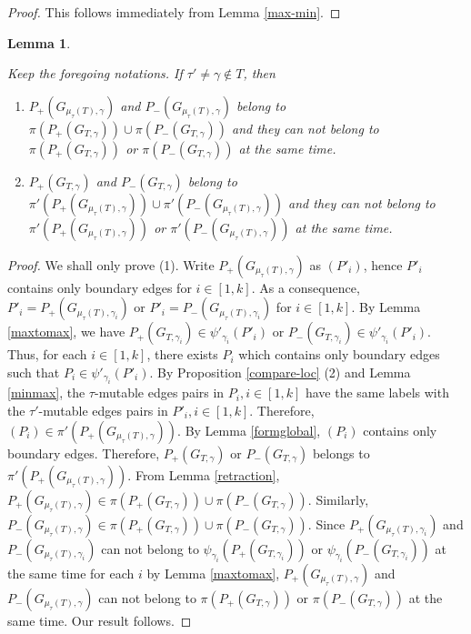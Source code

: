\documentclass[10pt]{amsart}
\theoremstyle{theorems}
\newtheorem{Lemma}[Theorem]{Lemma}
\begin{document}
\begin{proof}

This follows immediately from Lemma \ref{max-min}.
\end{proof}

\medskip

\begin{Lemma}\label{maxtomax1}

Keep the foregoing notations. If $\tau'\neq \gamma\notin T$, then

\begin{enumerate}[$(1)$]

  \item $P_{+}(G_{\mu_{\tau}(T),\gamma})$ and $P_{-}(G_{\mu_{\tau}(T),\gamma})$ belong to $\pi(P_{+}(G_{T,\gamma}))\cup \pi(P_{-}(G_{T,\gamma}))$ and they can not belong to $\pi(P_{+}(G_{T,\gamma}))$ or $\pi(P_{-}(G_{T,\gamma}))$ at the same time.

  \item $P_{+}(G_{T,\gamma})$ and $P_{-}(G_{T,\gamma})$ belong to $\pi'(P_{+}(G_{\mu_{\tau}(T),\gamma}))\cup \pi'(P_{-}(G_{\mu_{\tau}(T),\gamma}))$ and they can not belong to $\pi'(P_{+}(G_{\mu_{\tau}(T),\gamma}))$ or $\pi'(P_{-}(G_{\mu_{\tau}(T),\gamma}))$ at the same time.

\end{enumerate}

\end{Lemma}

\begin{proof}

We shall only prove (1). Write $P_{+}(G_{\mu_{\tau}(T),\gamma})$ as $(P'_i)$, hence $P'_i$ contains only boundary edges for $i\in [1,k]$. As a consequence, $P'_i=P_{+}(G_{\mu_{\tau}(T),\gamma_i})$ or $P'_i=P_{-}(G_{\mu_{\tau}(T),\gamma_i})$ for $i\in [1,k]$. By Lemma \ref{maxtomax}, we have $P_{+}(G_{T,\gamma_i})\in \psi'_{\gamma_i}(P'_i)$ or $P_{-}(G_{T,\gamma_i})\in \psi'_{\gamma_i}(P'_i)$. Thus, for each $i\in [1,k]$, there exists $P_i$ which contains only boundary edges such that $P_i\in \psi'_{\gamma_i}(P'_i)$. By Proposition \ref{compare-loc} (2) and Lemma \ref{minmax}, the $\tau$-mutable edges pairs in $P_i, i\in [1,k]$ have the same labels with the $\tau'$-mutable edges pairs in $P'_i, i\in [1,k]$. Therefore, $(P_i)\in \pi'(P_{+}(G_{\mu_{\tau}(T),\gamma}))$. By Lemma \ref{formglobal}, $(P_i)$ contains only boundary edges. Therefore, $P_{+}(G_{T,\gamma})$ or $P_{-}(G_{T,\gamma})$ belongs to $\pi'(P_{+}(G_{\mu_{\tau}(T),\gamma}))$. From Lemma \ref{retraction}, $P_{+}(G_{\mu_{\tau}(T),\gamma})\in \pi(P_{+}(G_{T,\gamma}))\cup \pi(P_{-}(G_{T,\gamma}))$. Similarly, $P_{-}(G_{\mu_{\tau}(T),\gamma})\in \pi(P_{+}(G_{T,\gamma}))\cup \pi(P_{-}(G_{T,\gamma}))$. Since $P_{+}(G_{\mu_{\tau}(T),\gamma_i})$ and $P_{-}(G_{\mu_{\tau}(T),\gamma_i})$ can not belong to $\psi_{\gamma_i}(P_{+}(G_{T,\gamma_i}))$ or $\psi_{\gamma_i}(P_{-}(G_{T,\gamma_i}))$ at the same time for each $i$ by Lemma \ref{maxtomax}, $P_{+}(G_{\mu_{\tau}(T),\gamma})$ and $P_{-}(G_{\mu_{\tau}(T),\gamma})$ can not belong to $\pi(P_{+}(G_{T,\gamma}))$ or $\pi(P_{-}(G_{T,\gamma}))$ at the same time. Our result follows.
\end{proof}
\end{document}
